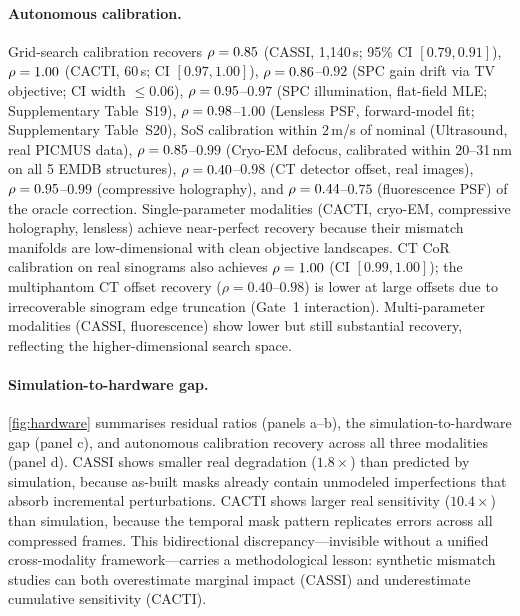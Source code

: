 \paragraph{Autonomous calibration.}
Grid-search calibration recovers $\rho = 0.85$ (CASSI, 1{,}140\,s; 95\% CI $[0.79, 0.91]$), $\rho = 1.00$ (CACTI, 60\,s; CI $[0.97, 1.00]$), $\rho = 0.86$--$0.92$ (SPC gain drift via TV objective; CI width $\leq 0.06$), $\rho = 0.95$--$0.97$ (SPC illumination, flat-field MLE; Supplementary Table~S19), $\rho = 0.98$--$1.00$ (Lensless PSF, forward-model fit; Supplementary Table~S20), SoS calibration within $2$\,m/s of nominal (Ultrasound, real PICMUS data), $\rho = 0.85$--$0.99$ (Cryo-EM defocus, calibrated within 20--31\,nm on all 5 EMDB structures), $\rho = 0.40$--$0.98$ (CT detector offset, real images), $\rho = 0.95$--$0.99$ (compressive holography), and $\rho = 0.44$--$0.75$ (fluorescence PSF) of the oracle correction. Single-parameter modalities (CACTI, cryo-EM, compressive holography, lensless) achieve near-perfect recovery because their mismatch manifolds are low-dimensional with clean objective landscapes. CT CoR calibration on real sinograms also achieves $\rho = 1.00$ (CI $[0.99, 1.00]$); the multiphantom CT offset recovery ($\rho = 0.40$--$0.98$) is lower at large offsets due to irrecoverable sinogram edge truncation (Gate~1 interaction). Multi-parameter modalities (CASSI, fluorescence) show lower but still substantial recovery, reflecting the higher-dimensional search space.

\paragraph{Simulation-to-hardware gap.}
\cref{fig:hardware} summarises residual ratios (panels a--b), the simulation-to-hardware gap (panel c), and autonomous calibration recovery across all three modalities (panel d). CASSI shows smaller real degradation ($1.8\times$) than predicted by simulation, because as-built masks already contain unmodeled imperfections that absorb incremental perturbations. CACTI shows larger real sensitivity ($10.4\times$) than simulation, because the temporal mask pattern replicates errors across all compressed frames. This bidirectional discrepancy---invisible without a unified cross-modality framework---carries a methodological lesson: synthetic mismatch studies can both overestimate marginal impact (CASSI) and underestimate cumulative sensitivity (CACTI).


